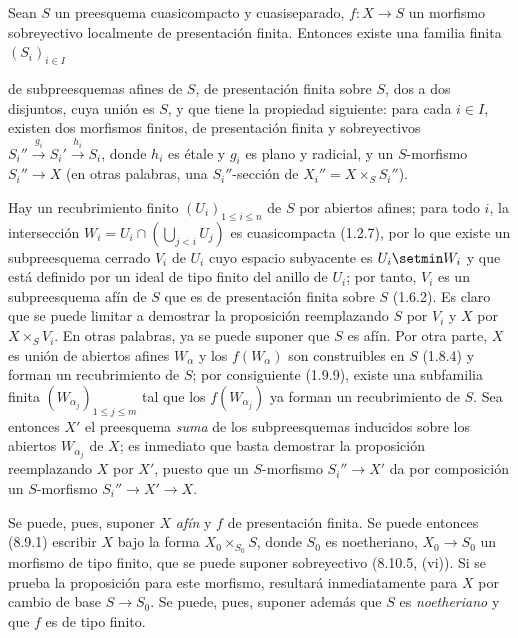 \begin{proposition}[17.16.4]
\label{IV.17.16.4}
Sean $S$ un preesquema cuasicompacto y cuasiseparado, $f:X\to S$ un morfismo sobreyectivo localmente de presentación finita. Entonces existe una familia finita $(S_i)_{i\in I}$


de subpreesquemas afines de $S$, de presentación finita sobre $S$, dos a dos disjuntos, cuya unión es $S$, y que tiene la propiedad siguiente: para cada $i\in I$, existen dos morfismos finitos, de presentación finita y sobreyectivos
$S_i''\xrightarrow{g_i}S_i'\xrightarrow{h_i}S_i$,
donde $h_i$ es étale y $g_i$ es plano y radicial, y un $S$-morfismo $S_i''\to X$ \textup{(en otras palabras, una} $S_i''$-sección \textup{de} $X_i''=X\times_S S_i''$\textup{)}.
\end{proposition}

Hay un recubrimiento finito $(U_i)_{1\leq i\leq n}$ de $S$ por abiertos afines; para todo $i$, la intersección
$W_i=U_i\cap\left(\bigcup_{j<i}U_j\right)$
es cuasicompacta (1.2.7), por lo que existe un subpreesquema cerrado $V_i$ de $U_i$ cuyo espacio subyacente es $U_i\setmin W_i$ y que está definido por un ideal de tipo finito del anillo de $U_i$; por tanto, $V_i$ es un subpreesquema afín de $S$ que es de presentación finita sobre $S$ (1.6.2). Es claro que se puede limitar a demostrar la proposición reemplazando $S$ por $V_i$ y $X$ por $X\times_S V_i$. En otras palabras, ya se puede suponer que $S$ es afín. Por otra parte, $X$ es unión de abiertos afines $W_\alpha$ y los $f(W_\alpha)$ son construibles en $S$ (1.8.4) y forman un recubrimiento de $S$; por consiguiente (1.9.9), existe una subfamilia finita $(W_{\alpha_j})_{1\leq j\leq m}$ tal que los $f(W_{\alpha_j})$ ya forman un recubrimiento de $S$. Sea entonces $X'$ el preesquema \emph{suma} de los subpreesquemas inducidos sobre los abiertos $W_{\alpha_j}$ de $X$; es inmediato que basta demostrar la proposición reemplazando $X$ por $X'$, puesto que un $S$-morfismo $S_i''\to X'$ da por composición un $S$-morfismo $S_i''\to X'\to X$.

Se puede, pues, suponer $X$ \emph{afín} y $f$ de presentación finita. Se puede entonces (8.9.1) escribir $X$ bajo la forma $X_0\times_{S_0}S$, donde $S_0$ es noetheriano, $X_0\to S_0$ un morfismo de tipo finito, que se puede suponer sobreyectivo (8.10.5, (vi)). Si se prueba la proposición para este morfismo, resultará inmediatamente para $X$ por cambio de base $S\to S_0$. Se puede, pues, suponer además que $S$ es \emph{noetheriano} y que $f$ es de tipo finito.

